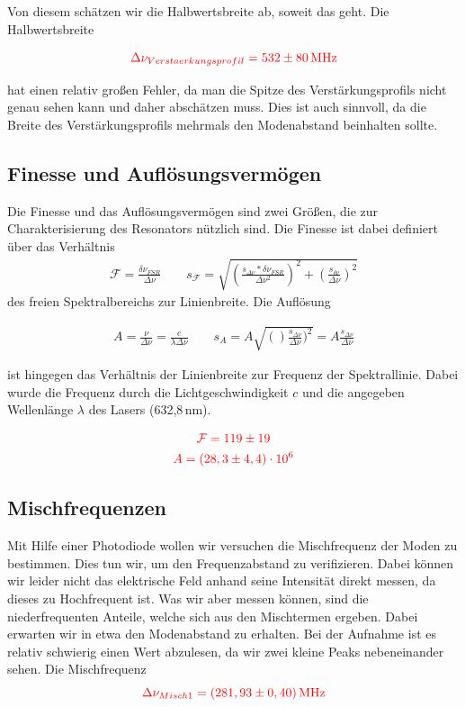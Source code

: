 Von diesem schätzen wir die Halbwertsbreite ab, soweit das geht. Die Halbwertsbreite 

\begin{equation}
    \textcolor{red}{\Delta\nu_{Verstaerkungsprofil} = 532 \pm 80 \, \mathrm{MHz}}
\end{equation}

hat einen relativ großen Fehler, da man die Spitze des Verstärkungsprofils nicht genau sehen kann und daher abschätzen muss.
Dies ist auch sinnvoll, da die Breite des Verstärkungsprofils mehrmals den Modenabstand beinhalten sollte.


\subsection*{Finesse und Auflösungsvermögen}

Die Finesse und das Auflösungsvermögen sind zwei Größen, die zur Charakterisierung des Resonators nützlich sind. Die Finesse ist dabei
definiert über das Verhältnis 
\begin{align}
    \mathcal{F} = \frac{\delta \nu_{FSR}}{\Delta\nu} \qquad s_{\mathcal{F}} = \sqrt{(\frac{s_{\Delta \nu}*\delta \nu_{FSR}}{\Delta\nu^2})^2+(\frac{s_{\delta\nu}}{\Delta \nu})^2}
\end{align}
 des freien Spektralbereichs zur Linienbreite. Die Auflösung 

 \begin{align}
     A = \frac{\nu}{\Delta\nu} = \frac{c}{\lambda\Delta\nu} \qquad s_A = A\sqrt{()\frac{s_{\Delta\nu}}{\Delta\nu})^2} = A\frac{s_{\Delta\nu}}{\Delta\nu}
 \end{align}
 
 ist hingegen das Verhältnis der Linienbreite zur Frequenz der Spektrallinie. Dabei wurde die Frequenz durch
 die Lichtgeschwindigkeit $c$ und die angegeben Wellenlänge $\lambda$ des Lasers (632,8\,nm). 
 
 \begin{gather}
    \textcolor{red}{\mathcal{F} = 119\pm19}\\
    \textcolor{red}{A = (28,3\pm4,4)\cdot10^6}
 \end{gather}


 \subsection*{Mischfrequenzen}

 Mit Hilfe einer Photodiode wollen wir versuchen die Mischfrequenz der Moden zu bestimmen. Dies tun wir, um den Frequenzabstand zu verifizieren. 
 Dabei können wir leider nicht das elektrische Feld anhand seine Intensität direkt messen, da dieses zu Hochfrequent ist. Was wir aber messen können, sind 
 die niederfrequenten Anteile, welche sich aus den Mischtermen ergeben. Dabei erwarten wir in etwa den Modenabstand zu erhalten. 
 Bei der Aufnahme ist es relativ schwierig einen Wert abzulesen, da wir zwei kleine Peaks nebeneinander sehen. Die Mischfrequenz 
 \begin{equation*}
     \textcolor{red}{\Delta \nu_{Misch1} = (281,93\pm0,40)\,\mathrm{MHz} }
 \end{equation*}

